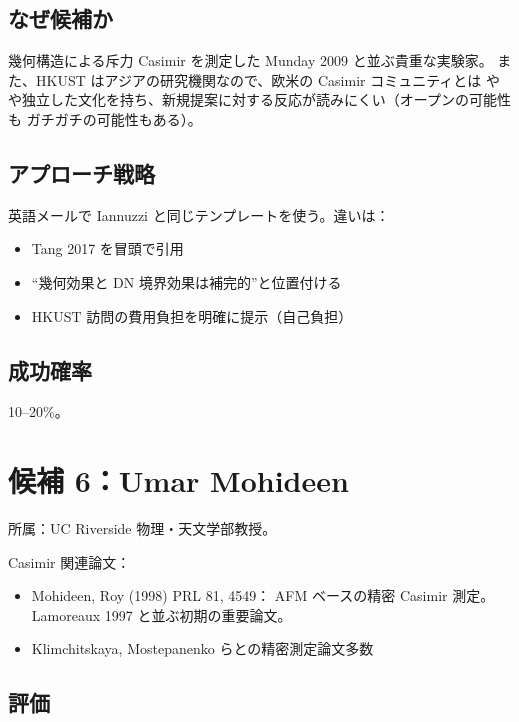 \documentclass[11pt,a4paper]{article}
\def\textbf#1{#1}%
\begin{document}
\subsection{なぜ候補か}

幾何構造による斥力 Casimir を測定した \textbf{Munday 2009 と並ぶ貴重な実験家}。
また、HKUST はアジアの研究機関なので、欧米の Casimir コミュニティとは
やや独立した文化を持ち、新規提案に対する反応が読みにくい（オープンの可能性も
ガチガチの可能性もある）。

\subsection{アプローチ戦略}

英語メールで Iannuzzi と同じテンプレートを使う。違いは：
\begin{itemize}
\item Tang 2017 を冒頭で引用
\item ``幾何効果と DN 境界効果は補完的''と位置付ける
\item HKUST 訪問の費用負担を明確に提示（自己負担）
\end{itemize}

\subsection{成功確率}

\textbf{10--20\%}。

\newpage

\section{候補 6：Umar Mohideen}

\begin{candidatebox}
\textbf{所属}：UC Riverside 物理・天文学部教授。

\textbf{Casimir 関連論文}：
\begin{itemize}
\item \textbf{Mohideen, Roy (1998) PRL 81, 4549}：
  AFM ベースの精密 Casimir 測定。Lamoreaux 1997 と並ぶ初期の重要論文。
\item Klimchitskaya, Mostepanenko らとの精密測定論文多数
\end{itemize}
\end{candidatebox}

\subsection{評価}
\end{document}
